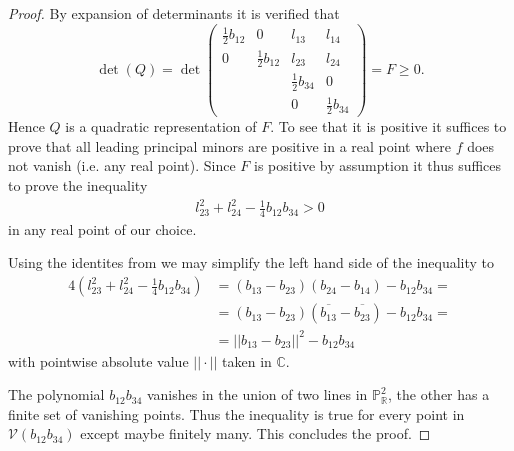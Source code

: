 \documentclass[a4paper,10pt]{amsart}
\theoremstyle{definition}
\theoremstyle{plain}
\newcommand{\cV}{{\mathcal V}}
\newcommand{\C}{{\mathbb C}}
\newcommand{\R}{{\mathbb R}}
\newcommand{\pp}{\mathbb{P}}
\begin{document}
\begin{proof}
    By expansion of determinants it is verified that
    \begin{equation*}
        \det(Q) = \det\begin{pmatrix}
            \frac{1}{2} b_{12} & 0 & l_{13} & l_{14} \\
            0 & \frac{1}{2} b_{12} & l_{23} & l_{24} \\
            &  & \frac{1}{2} b_{34} & 0 \\
            & & 0 & \frac{1}{2} b_{34}
     \end{pmatrix} = F \geq 0.
    \end{equation*}
    Hence $Q$ is a quadratic representation of $F$. To see that it is positive it suffices to prove that all leading principal minors are positive in a real point where $f$ does not vanish (i.e. any real point). Since $F$ is positive by assumption it thus suffices to prove the inequality
    \begin{align*}
        l_{23}^2 + l_{24}^2 - \frac{1}{4} b_{12}b_{34} > 0
    \end{align*}
    in any real point of our choice.

    Using the identites from  we may simplify the left hand side of the inequality to
    \begin{align*}
        4(l_{23}^2 + l_{24}^2 - \frac{1}{4} b_{12}b_{34}) &= (b_{13} - b_{23})(b_{24}-b_{14}) - b_{12}b_{34} = \\
        &= (b_{13} - b_{23})(\overline{b_{13}} - \overline{b_{23}}) - b_{12}b_{34} = \\
        &= ||b_{13} - b_{23}||^2 - b_{12}b_{34}
    \end{align*}
    with pointwise absolute value $|| \cdot ||$ taken in $\C$.
    
    The polynomial $b_{12}b_{34}$ vanishes in the union of two lines in $\pp^2_\R$, the other has a finite set of vanishing points. Thus the inequality is true for every point in $\cV(b_{12}b_{34})$ except maybe finitely many. This concludes the proof.
\end{proof}
\end{document}
